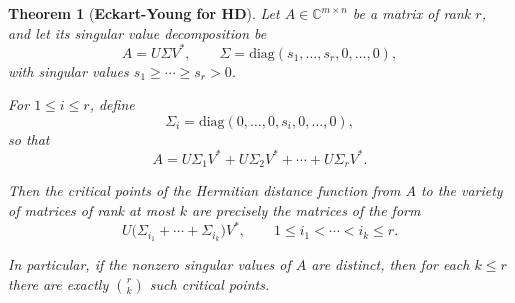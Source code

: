 \documentclass[10pt,a4paper]{amsart}
\newtheorem{theorem}{Theorem}
\begin{document}
\begin{theorem}[\textbf{Eckart-Young for HD}]\label{gg}
Let $A \in \mathbb{C}^{m \times n}$ be a matrix of rank $r$, and let its singular value decomposition be
$$
A = U \Sigma V^*, \qquad 
\Sigma = \mathrm{diag}(s_1, \dots, s_r, 0, \dots, 0),
$$
with singular values $s_1 \geq \cdots \geq s_r > 0$.  

For $1 \leq i \leq r$, define 
$$
\Sigma_i = \mathrm{diag}(0, \dots, 0, s_i, 0, \dots, 0),
$$
so that
$$
A = U \Sigma_1 V^* + U \Sigma_2 V^* + \cdots + U \Sigma_r V^*.
$$

Then the critical points of the Hermitian distance  function from $A$ to the variety of matrices of rank at most $k$ are precisely the matrices of the form
$$
U \bigl(\Sigma_{i_1} + \cdots + \Sigma_{i_k}\bigr) V^*, 
\qquad 1 \leq i_1 < \cdots < i_k \leq r.
$$

In particular, if the nonzero singular values of $A$ are distinct, then for each $k \leq r$ there are exactly $\binom{r}{k}$ such critical points.
\end{theorem}
\end{document}
